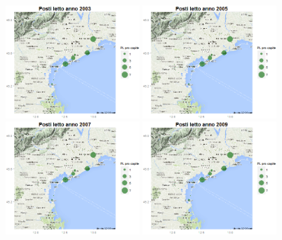 \documentclass[a4paper,11pt,twoside,openright]{book}							%
\begin{document}
\begin{figure}[H]
	\includegraphics[trim=0cm 0cm 0cm 0cm,clip=true,width=0.45\textwidth]{Immagini/venezia_dati/PL2003.png}
	\includegraphics[trim=0cm 0cm 0cm 0cm,clip=true,width=0.45\textwidth]{Immagini/venezia_dati/PL2005.png}
	\includegraphics[trim=0cm 0cm 0cm 0cm,clip=true,width=0.45\textwidth]{Immagini/venezia_dati/PL2007.png}
	\includegraphics[trim=0cm 0cm 0cm 0cm,clip=true,width=0.45\textwidth]{Immagini/venezia_dati/PL2009.png}

\end{figure}
\end{document}
